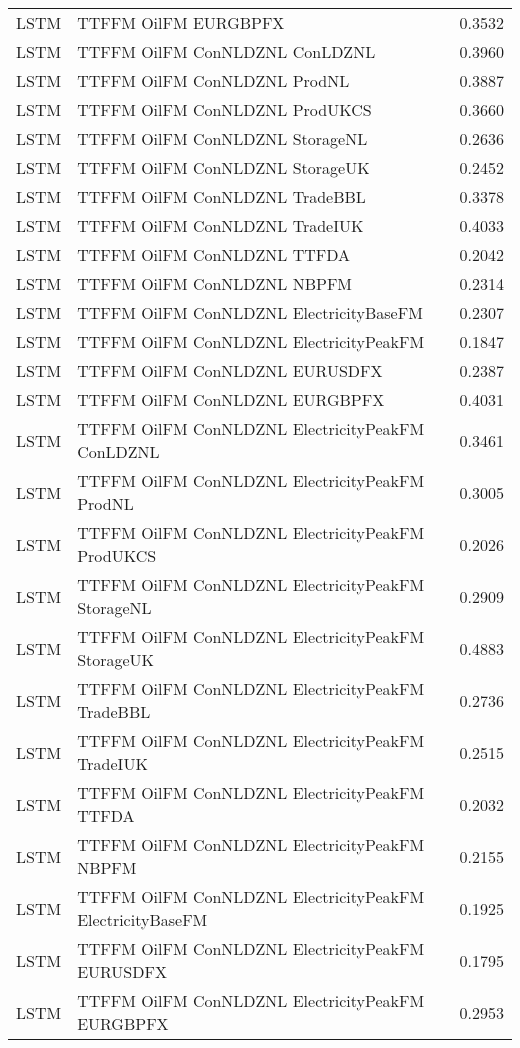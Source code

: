 \begin{table}[h!]
\begin{adjustbox}{max width=\textwidth}
\begin{tabular}{llr}
  LSTM & TTFFM OilFM EURGBPFX & 0.3532 \\ 
  LSTM & TTFFM OilFM ConNLDZNL ConLDZNL & 0.3960 \\ 
  LSTM & TTFFM OilFM ConNLDZNL ProdNL & 0.3887 \\ 
  LSTM & TTFFM OilFM ConNLDZNL ProdUKCS & 0.3660 \\ 
  LSTM & TTFFM OilFM ConNLDZNL StorageNL & 0.2636 \\ 
  LSTM & TTFFM OilFM ConNLDZNL StorageUK & 0.2452 \\ 
  LSTM & TTFFM OilFM ConNLDZNL TradeBBL & 0.3378 \\ 
  LSTM & TTFFM OilFM ConNLDZNL TradeIUK & 0.4033 \\ 
  LSTM & TTFFM OilFM ConNLDZNL TTFDA & 0.2042 \\ 
  LSTM & TTFFM OilFM ConNLDZNL NBPFM & 0.2314 \\ 
  LSTM & TTFFM OilFM ConNLDZNL ElectricityBaseFM & 0.2307 \\ 
  LSTM & TTFFM OilFM ConNLDZNL ElectricityPeakFM & 0.1847 \\ 
  LSTM & TTFFM OilFM ConNLDZNL EURUSDFX & 0.2387 \\ 
  LSTM & TTFFM OilFM ConNLDZNL EURGBPFX & 0.4031 \\ 
  LSTM & TTFFM OilFM ConNLDZNL ElectricityPeakFM ConLDZNL & 0.3461 \\ 
  LSTM & TTFFM OilFM ConNLDZNL ElectricityPeakFM ProdNL & 0.3005 \\ 
  LSTM & TTFFM OilFM ConNLDZNL ElectricityPeakFM ProdUKCS & 0.2026 \\ 
  LSTM & TTFFM OilFM ConNLDZNL ElectricityPeakFM StorageNL & 0.2909 \\ 
  LSTM & TTFFM OilFM ConNLDZNL ElectricityPeakFM StorageUK & 0.4883 \\ 
  LSTM & TTFFM OilFM ConNLDZNL ElectricityPeakFM TradeBBL & 0.2736 \\ 
  LSTM & TTFFM OilFM ConNLDZNL ElectricityPeakFM TradeIUK & 0.2515 \\ 
  LSTM & TTFFM OilFM ConNLDZNL ElectricityPeakFM TTFDA & 0.2032 \\ 
  LSTM & TTFFM OilFM ConNLDZNL ElectricityPeakFM NBPFM & 0.2155 \\ 
  LSTM & TTFFM OilFM ConNLDZNL ElectricityPeakFM ElectricityBaseFM & 0.1925 \\ 
  LSTM & TTFFM OilFM ConNLDZNL ElectricityPeakFM EURUSDFX & 0.1795 \\ 
  LSTM & TTFFM OilFM ConNLDZNL ElectricityPeakFM EURGBPFX & 0.2953 \\ 

\end{tabular}
\end{adjustbox}
\end{table}
